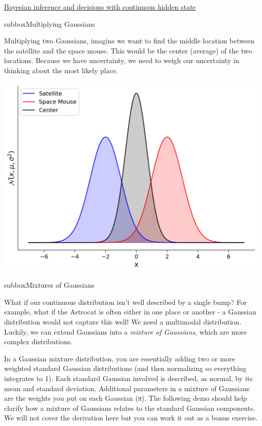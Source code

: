 \begin{textbox}{\href{https://compneuro.neuromatch.io/tutorials/W3D1_BayesianDecisions/student/W3D1_Tutorial2.html}{Bayesian inference and decisions with continuous hidden state } }
\begin{subbox}{subbox}{Multiplying Gaussians}
\scriptsize

Multiplying two Gaussians, imagine we want to find the middle location between the satellite and the space mouse. This would be the center (average) of the two locations. Because we have uncertainty, we need to weigh our uncertainty in thinking about the most likely place. 


\begin{center}
    
\includegraphics[scale=0.18]{Figures/BD/BD_Figure6.png}
\end{center}
\end{subbox}
\begin{subbox}{subbox}{Mixtures of Gaussians}
\scriptsize

What if our continuous distribution isn't well described by a single bump? For example, what if the Astrocat is often either in one place or another - a Gaussian distribution would not capture this well! We need a multimodal distribution. Luckily, we can extend Gaussians into a \textit{mixture of Gaussians}, which are more complex distributions.  

In a Gaussian mixture distribution, you are essentially adding two or more weighted standard Gaussian distributions (and then normalizing so everything integrates to 1). Each standard Gaussian involved is described, as normal, by its mean and standard deviation. Additional parameters in a mixture of Gaussians are the weights you put on each Gaussian (π). The following demo should help clarify how a mixture of Gaussians relates to the standard Gaussian components. We will not cover the derivation here but you can work it out as a bonus exercise.


\end{subbox}
\end{textbox}
